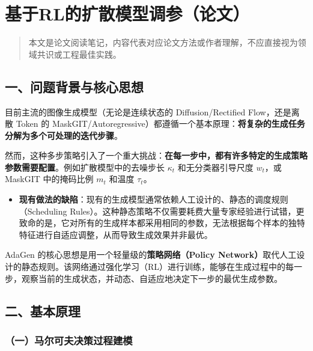 \clearpage

\hypertarget{ux57faux4e8erlux7684ux6269ux6563ux6a21ux578bux8c03ux53c2ux8bbaux6587}{%
\section{基于RL的扩散模型调参（论文）}\label{ux57faux4e8erlux7684ux6269ux6563ux6a21ux578bux8c03ux53c2ux8bbaux6587}}

\begin{quote}
本文是论文阅读笔记，内容代表对应论文方法或作者理解，不应直接视为领域共识或工程最佳实践。
\end{quote}

\hypertarget{ux4e00ux95eeux9898ux80ccux666fux4e0eux6838ux5fc3ux601dux60f3}{%
\subsection{一、问题背景与核心思想}\label{ux4e00ux95eeux9898ux80ccux666fux4e0eux6838ux5fc3ux601dux60f3}}

目前主流的图像生成模型（无论是连续状态的 Diffusion/Rectified Flow，还是离散 Token 的 MaskGIT/Autoregressive）都遵循一个基本原理：\textbf{将复杂的生成任务分解为多个可处理的迭代步骤}。

然而，这种多步策略引入了一个重大挑战：\textbf{在每一步中，都有许多特定的生成策略参数需要配置}。例如扩散模型中的去噪步长 \(\kappa_t\) 和无分类器引导尺度 \(w_t\)，或 MaskGIT 中的掩码比例 \(m_t\) 和温度 \(\tau_t\)。

\begin{itemize}
\tightlist
\item
  \textbf{现有做法的缺陷}：现有的生成模型通常依赖人工设计的、静态的调度规则（Scheduling Rules）。这种静态策略不仅需要耗费大量专家经验进行试错，更致命的是，它对所有的生成样本都采用相同的参数，无法根据每个样本的独特特征进行自适应调整，从而导致生成效果并非最优。
\end{itemize}

AdaGen 的核心思想是用一个轻量级的\textbf{策略网络（Policy Network）}取代人工设计的静态规则。该网络通过强化学习（RL）进行训练，能够在生成过程中的每一步，观察当前的生成状态，并动态、自适应地决定下一步的最优生成参数。

\hypertarget{ux4e8cux57faux672cux539fux7406}{%
\subsection{二、基本原理}\label{ux4e8cux57faux672cux539fux7406}}

\hypertarget{ux4e00ux9a6cux5c14ux53efux592bux51b3ux7b56ux8fc7ux7a0bux5efaux6a21}{%
\subsubsection{（一）马尔可夫决策过程建模}\label{ux4e00ux9a6cux5c14ux53efux592bux51b3ux7b56ux8fc7ux7a0bux5efaux6a21}}


